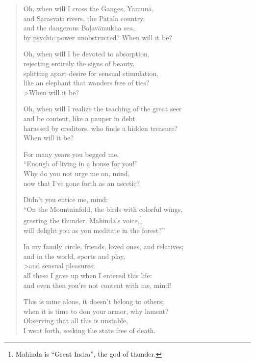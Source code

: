 \documentclass[12pt,openany]{book}%
\begin{document}
\begin{verse}
Oh, when will I cross the Ganges, \textsanskrit{Yamunā}, \\
and \textsanskrit{Sarasvatī} rivers, the \textsanskrit{Pātāla} country, \\
and the dangerous \textsanskrit{Baḷavāmukha} sea, \\
by psychic power unobstructed? When will it be? 

Oh, when will I be devoted to absorption, \\
rejecting entirely the signs of beauty, \\
splitting apart desire for sensual stimulation, \\
like an elephant that wanders free of ties? \\>When will it be? 

Oh, when will I realize the teaching of the great seer \\
and be content, like a pauper in debt \\
harassed by creditors, who finds a hidden treasure? \\
When will it be? 

For many years you begged me, \\
“Enough of living in a house for you!” \\
Why do you not urge me on, mind, \\
now that I’ve gone forth as an ascetic? 

Didn’t you entice me, mind: \\
“On the Mountainfold, the birds with colorful wings, \\
greeting the thunder, Mahinda’s voice,\footnote{Mahinda is “Great Indra”, the god of thunder. } \\
will delight you as you meditate in the forest?” 

In my family circle, friends, loved ones, and relatives; \\
and in the world, sports and play, \\>and sensual pleasures; \\
all these I gave up when I entered this life: \\
and even then you’re not content with me, mind! 

This is mine alone, it doesn’t belong to others; \\
when it is time to don your armor, why lament? \\
Observing that all this is unstable, \\
I went forth, seeking the state free of death. 


\end{verse}
\end{document}
